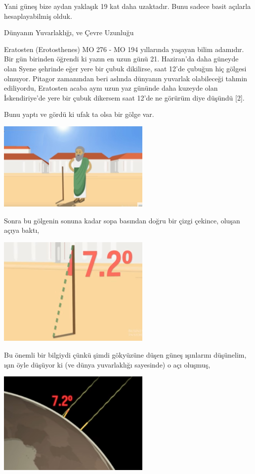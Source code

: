 \documentclass[12pt,fleqn]{article}\usepackage{../../common}
\begin{document}
Yani güneş bize aydan yaklaşık 19 kat daha uzaktadır. Bunu sadece basit açılarla
hesaplayabilmiş olduk.

Dünyanın Yuvarlaklığı, ve Çevre Uzunluğu

Eratosten (Erotosthenes) MO 276 - MO 194 yıllarında yaşayan bilim adamıdır. Bir
gün birinden öğrendi ki yazın en uzun günü 21. Haziran'da daha güneyde olan
Syene şehrinde eğer yere bir çubuk dikilirse, saat 12'de çubuğun hiç gölgesi
olmuyor. Pitagor zamanından beri aslında dünyanın yuvarlak olabileceği
tahmin ediliyordu, Eratosten acaba aynı uzun yaz gününde daha kuzeyde olan
İskendiriye'de yere bir çubuk dikersem saat 12'de ne görürüm diye düşündü [2].

Bunu yaptı ve gördü ki ufak ta olsa bir gölge var. 

\includegraphics[width=20em]{circum3.jpg}

Sonra bu gölgenin sonuna kadar sopa basından doğru bir çizgi çekince, oluşan
açıya baktı,

\includegraphics[width=20em]{circum4.jpg}

Bu önemli bir bilgiydi çünkü şimdi gökyüzüne düşen güneş ışınlarını düşünelim,
ışın öyle düşüyor ki (ve dünya yuvarlaklığı sayesinde) o açı oluşmuş, 

\includegraphics[width=20em]{circum1.jpg}
\end{document}
